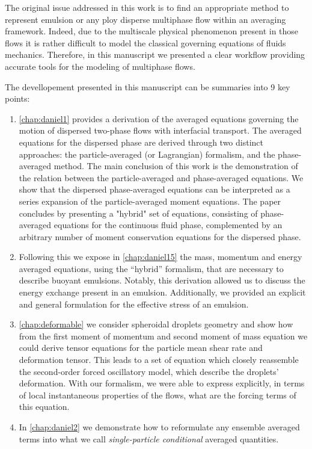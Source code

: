 
The original issue addressed in this work is to find an appropriate method to represent emulsion or any ploy disperse multiphase flow within an averaging framework.
Indeed, due to the multiscale physical phenomenon present in those flows it is rather difficult to model the classical governing equations of fluids mechanics.  
Therefore, in this manuscript we presented a clear workflow providing accurate tools for the modeling of multiphase flows. 

The devellopement presented in this manuscript can be summaries into 9 key points:
\begin{enumerate}
    \item \ref{chap:daniel1} provides a derivation of the averaged equations governing the motion of dispersed two-phase flows with interfacial transport. 
    The averaged equations for the dispersed phase are derived through two distinct approaches: the particle-averaged (or Lagrangian) formalism, and the phase-averaged method. 
    The main conclusion of this work is the demonstration of the relation between the particle-averaged and phase-averaged equations. 
    We show that the dispersed phase-averaged equations can be interpreted as a series expansion of the particle-averaged moment equations. 
    The paper concludes by presenting a "hybrid" set of equations, consisting of phase-averaged equations for the continuous fluid phase, complemented by an arbitrary number of moment conservation equations for the dispersed phase.
    \item Following this we expose in \ref{chap:daniel15} the mass, momentum and energy averaged equations, using the ``hybrid'' formalism, that are necessary to describe buoyant emulsions. 
    Notably, this derivation allowed us to discuss the energy exchange present in an emulsion.
    Additionally, we provided an explicit and general formulation for the eﬀective stress of an emulsion.
    \item \ref{chap:deformable} we consider spheroidal droplets geometry and show how from the first moment of momentum and second moment of mass equation we could derive tensor equations for the particle mean shear rate and deformation tensor. 
    This leads to a set of equation which closely reassemble the second-order forced oscillatory model, which describe the droplets' deformation. 
    With our formalism, we were able to express explicitly, in terms of local instantaneous properties of the flows, what are the forcing terms of this equation.  
    \item In \ref{chap:daniel2} we demonstrate how to reformulate any ensemble averaged terms into what we call \textit{single-particle conditional} averaged quantities. 

\end{enumerate}
